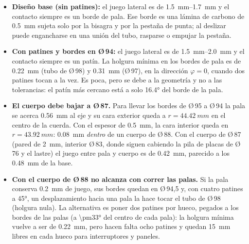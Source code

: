 \begin{itemize}[leftmargin=*]
  \item \textbf{Diseño base (sin patines):} el juego lateral es de \SIrange{1.5}{1.7}{mm} y
        el contacto siempre es un borde de pala. Ese borde es una lámina de carbono de
        \SI{0.5}{mm} sujeta solo por la bisagra y por la pestaña de punta; al deslizar
        puede engancharse en una unión del tubo, rasparse o empujar la pestaña.
  \item \textbf{Con patines y bordes en Ø\,94:} el juego lateral es de
        \SIrange{1.5}{2.0}{mm} y el contacto siempre es un patín. La holgura mínima en los
        bordes de pala es de \SI{0.22}{mm} (tubo de Ø\,98) y \SI{0.31}{mm} (Ø\,97), en la
        dirección $\varphi=0$, cuando dos patines tocan a la vez. Es poca, pero se debe a
        la geometría y no a las tolerancias: el patín más cercano está a solo
        \ang{16.4} del borde de la pala.
  \item \textbf{El cuerpo debe bajar a Ø\,87.} Para llevar los bordes de Ø\,95 a Ø\,94 la
        pala se acerca \SI{0.56}{mm} al eje y su cara exterior queda a $r=\SI{44.42}{mm}$
        en el centro de la cuerda. Con el espesor de \SI{0.5}{mm}, la cara interior queda
        en $r=\SI{43.92}{mm}$: \SI{0.08}{mm} \emph{dentro} de un cuerpo de Ø\,88. Con el
        cuerpo de Ø\,87 (pared de \SI{2}{mm}, interior Ø\,83, donde siguen cabiendo la
        pila de placas de Ø\,76 y el lastre) el juego entre pala y cuerpo es de
        \SI{0.42}{mm}, parecido a los \SI{0.48}{mm} de la base.
  \item \textbf{Con el cuerpo de Ø\,88 no alcanza con correr las palas.} Si la pala
        conserva \SI{0.2}{mm} de juego, sus bordes quedan en Ø\,94,5 y, con cuatro patines
        a \ang{45}, un desplazamiento hacia una pala la hace tocar el tubo de Ø\,98
        (holgura nula). La alternativa es poner dos patines por hueco, pegados a los
        bordes de las palas (a \ang{\pm33} del centro de cada pala): la holgura mínima
        vuelve a ser de \SI{0.22}{mm}, pero hacen falta ocho patines y quedan
        \SI{15}{mm} libres en cada hueco para interruptores y paneles.
\end{itemize}

